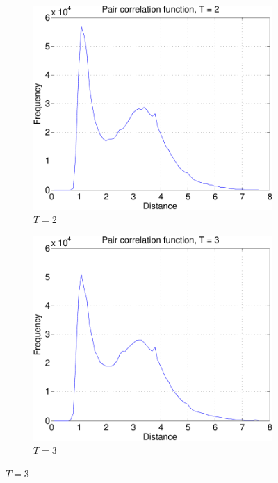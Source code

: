 \documentclass[10pt,a4paper]{article}
\begin{document}
 \begin{figure}[ht!]
 \centering
 \begin{subfigure}[b]{0.3\linewidth}
  \includegraphics[width=\textwidth]{figs/pair_corr_Teq2-crop.pdf}
  \caption{$T=2$}
  \label{fig:pcorr2}
 \end{subfigure}
 \begin{subfigure}[b]{0.3\linewidth}
  \includegraphics[width=\textwidth]{figs/pair_corr_Teq3-crop.pdf}
  \caption{$T=3$}
  \label{fig:pcorr3}
 \end{subfigure}

\end{figure}
\end{document}
